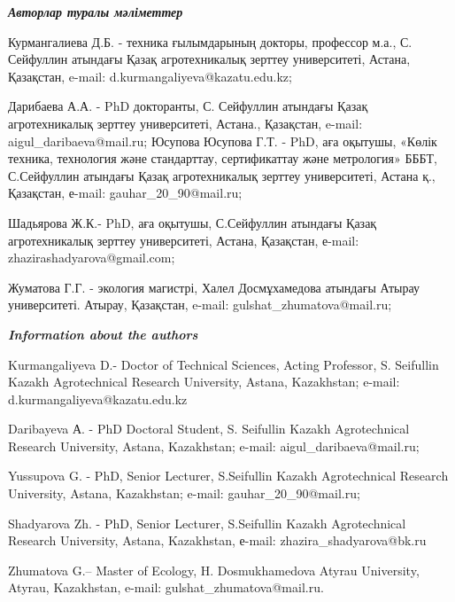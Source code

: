 \begin{info}
\hspace{1em}\emph{{\bfseries Авторлар туралы мәліметтер}}

Курмангалиева Д.Б. - техника ғылымдарының докторы, профессор м.а., С.
Сейфуллин атындағы Қазақ агротехникалық зерттеу университеті, Астана,
Қазақстан, e-mail: d.kurmangaliyeva@kazatu.edu.kz;

Дарибаева А.А. - PhD докторанты, С. Сейфуллин атындағы Қазақ
агротехникалық зерттеу университеті, Астана., Қазақстан, e-mail:
aigul\_daribaeva@mail.ru; Юсупова Юсупова Г.Т. - PhD, аға оқытушы,
«Көлік техника, технология және стандарттау, сертификаттау және
метрология» БББТ, С.Сейфуллин атындағы Қазақ агротехникалық зерттеу
университеті, Астана қ., Қазақстан, е-mail: gauhar\_20\_90@mail.ru;

Шадьярова Ж.К.- PhD, аға оқытушы, С.Сейфуллин атындағы Қазақ
агротехникалық зерттеу университеті, Астана, Қазақстан, е-mail:
zhazirashadyarova@gmail.com;

Жуматова Г.Г. - экология магистрі, Халел Досмұхамедова атындағы Атырау
университеті. Атырау, Қазақстан, e-mail: gulshat\_zhumatova@mail.ru;

\hspace{1em}\emph{{\bfseries Information about the authors}}

Kurmangaliyeva D.- Doctor of Technical Sciences, Acting Professor, S.
Seifullin Kazakh Agrotechnical Research University, Astana,
Kazakhstan; e-mail: d.kurmangaliyeva@kazatu.edu.kz

Daribayeva А. - PhD Doctoral Student, S. Seifullin Kazakh
Agrotechnical Research University, Astana, Kazakhstan; e-mail:
aigul\_daribaeva@mail.ru;

Yussupova G. - PhD, Senior Lecturer, S.Seifullin Kazakh Agrotechnical
Research University, Astana, Kazakhstan; e-mail:
gauhar\_20\_90@mail.ru;

Shadyarova Zh. - PhD, Senior Lecturer, S.Seifullin Kazakh
Agrotechnical Research University, Astana, Kazakhstan, е-mail:
zhazira\_shadyarova@bk.ru

Zhumatova G.-- Master of Ecology, H. Dosmukhamedova Atyrau University,
Atyrau, Kazakhstan, e-mail: gulshat\_zhumatova@mail.ru.
\end{info}
